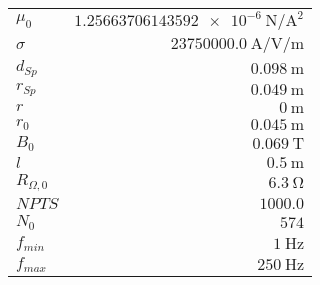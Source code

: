 
{%
    \begin{center}
    \label{tab:fitparams:alu:R}
    \begin{tabular}{lr}
    \toprule
        $\mu_0$ & $\SI{1.25663706143592e-6}{\newton\per\ampere\squared}$\\
        $\sigma$ & $\SI{23750000.0}{\ampere\per\volt\per\meter}$\\
        $d_{Sp}$ & $\SI{0.098}{\meter}$\\
        $r_{Sp}$ & $\SI{0.049}{\meter}$\\
        $r$ & $\SI{0}{\meter}$\\
        $r_{0}$ & $\SI{0.045}{\meter}$\\
        $B_0$ & $\SI{0.069}{\tesla}$\\
        $l$ & $\SI{0.5}{\meter}$\\
        $R_{\Omega,0}$ & $\SI{6.3}{\ohm}$\\
        $NPTS$ & $\num{1000.0}$\\
        $N_0$ & $\num{574}$\\
        $f_{min}$ & $\SI{1}{\hertz}$\\
        $f_{max}$ & $\SI{250}{\hertz}$\\

    \bottomrule
    \end{tabular}
    \end{center}
}

